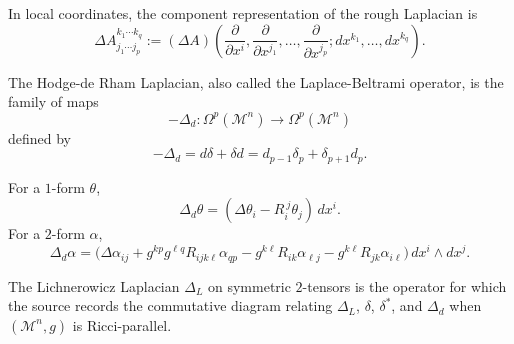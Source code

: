 \begin{definition}
\label{appa-def-rough-laplacian-components}
In local coordinates, the component representation of the rough Laplacian is
\[
\Delta A^{k_1\cdots k_q}_{j_1\cdots j_p}
:= (\Delta A)\!\left(\frac{\partial}{\partial x^i},\frac{\partial}{\partial x^{j_1}},\ldots,\frac{\partial}{\partial x^{j_p}};dx^{k_1},\ldots,dx^{k_q}\right).
\]
\end{definition}

\begin{definition}
\label{appa-def-hodge-de-rham-laplacian}
The Hodge-de Rham Laplacian, also called the Laplace-Beltrami operator, is the family of maps
\[
-\Delta_d:\Omega^p(\mathcal M^n)\to \Omega^p(\mathcal M^n)
\]
defined by
\[
-\Delta_d=d\delta+\delta d=d_{p-1}\delta_p+\delta_{p+1}d_p.
\]
\end{definition}

\begin{remark}
\label{appa-rem-hodge-laplacian-components}
For a \(1\)-form \(\theta\),
\[
\Delta_d\theta=(\Delta\theta_i-R_i^{\ j}\theta_j)\,dx^i.
\]
For a \(2\)-form \(\alpha\),
\[
\Delta_d\alpha
= \bigl(\Delta \alpha_{ij} + g^{kp}g^{\ell q}R_{ijk\ell}\alpha_{qp}
- g^{k\ell}R_{ik}\alpha_{\ell j}
- g^{k\ell}R_{jk}\alpha_{i\ell}\bigr)\,dx^i\wedge dx^j.
\]
\end{remark}

\begin{definition}
\label{appa-def-lichnerowicz-laplacian}
The Lichnerowicz Laplacian \(\Delta_L\) on symmetric \(2\)-tensors is the operator for which the source records the commutative diagram relating \(\Delta_L\), \(\delta\), \(\delta^*\), and \(\Delta_d\) when \((\mathcal M^n,g)\) is Ricci-parallel.
\end{definition}

